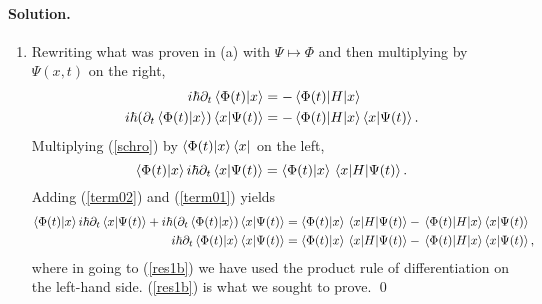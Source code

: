 \documentclass[11pt]{article}
\newcommand{\refeq}[1]{(\ref{#1})}
\newenvironment{solution}
{
    \paragraph{Solution.}
    \ignorespaces
}
{
}
\begin{document}
\begin{solution}
\begin{enumerate}
		\item Rewriting what was proven in (a) with $\Psi \mapsto \Phi$ and then multiplying by $\Psi(x, t)$ on the right,
			\begin{align}
				i \hbar \partial_t \braket{\Phi(t)}{x} &= -\mel{\Phi(t)}{H}{x} \\
				i \hbar (\partial_t \braket{\Phi(t)}{x}) \braket{x}{\Psi(t)} &= -\mel{\Phi(t)}{H}{x} \braket{x}{\Psi(t)}. \label{term01}
			\end{align}
			Multiplying \refeq{schro} by $\braket{\Phi(t)}{x} \bra{x}$ on the left,
			\begin{equation}
				\braket{\Phi(t)}{x} i \hbar \partial_t \braket{x}{\Psi(t)} = \braket{\Phi(t)}{x} \mel{x}{H}{\Psi(t)}. \label{term02}
			\end{equation}
			Adding \refeq{term02} and \refeq{term01} yields
			\begin{align}
				\braket{\Phi(t)}{x} i \hbar \partial_t \braket{x}{\Psi(t)} + i \hbar (\partial_t \braket{\Phi(t)}{x}) \braket{x}{\Psi(t)} &= \braket{\Phi(t)}{x} \mel{x}{H}{\Psi(t)} - \mel{\Phi(t)}{H}{x} \braket{x}{\Psi(t)} \\
				i \hbar \partial_t \braket{\Phi(t)}{x} \braket{x}{\Psi(t)} &= \braket{\Phi(t)}{x} \mel{x}{H}{\Psi(t)} - \mel{\Phi(t)}{H}{x} \braket{x}{\Psi(t)}, \label{res1b}
			\end{align}
			where in going to \refeq{res1b} we have used the product rule of differentiation on the left-hand side.   \refeq{res1b} is what we sought to prove. \qed
			

\end{enumerate}
\end{solution}
\end{document}
